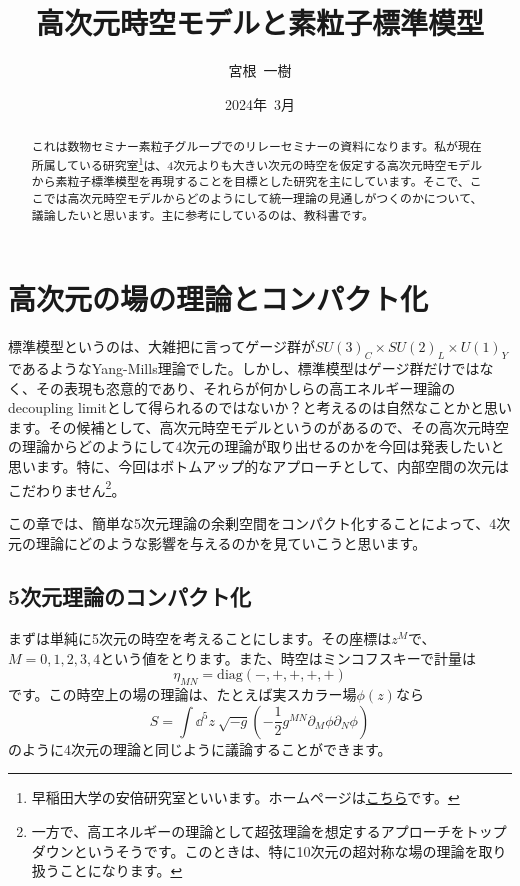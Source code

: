 \documentclass[unicode,a4paper,11pt]{ltjsarticle}
\title{高次元時空モデルと素粒子標準模型}
\author{宮根\ 一樹}
\date{2024年\ 3月}
\begin{document}
\maketitle

\begin{abstract}
   これは数物セミナー素粒子グループでのリレーセミナーの資料になります。私が現在所属している研究室\footnote{
      早稲田大学の安倍研究室といいます。ホームページは\href{http://www.hep.phys.waseda.ac.jp/index-j.html}{こちら}です。
   }は、4次元よりも大きい次元の時空を仮定する高次元時空モデルから素粒子標準模型を再現することを目標とした研究を主にしています。そこで、ここでは高次元時空モデルからどのようにして統一理論の見通しがつくのかについて、議論したいと思います。主に参考にしているのは、教科書\cite{Fujii:2005}です。
\end{abstract}

\tableofcontents

\clearpage

\section{高次元の場の理論とコンパクト化}

標準模型というのは、大雑把に言ってゲージ群が$SU(3)_{C}\times SU(2)_{L}\times U(1)_{Y}$であるようなYang-Mills理論でした。しかし、標準模型はゲージ群だけではなく、その表現も恣意的であり、それらが何かしらの高エネルギー理論のdecoupling limitとして得られるのではないか？と考えるのは自然なことかと思います。その候補として、高次元時空モデルというのがあるので、その高次元時空の理論からどのようにして4次元の理論が取り出せるのかを今回は発表したいと思います。特に、今回はボトムアップ的なアプローチとして、内部空間の次元はこだわりません\footnote{
   一方で、高エネルギーの理論として超弦理論を想定するアプローチをトップダウンというそうです。このときは、特に10次元の超対称な場の理論を取り扱うことになります。
}。

この章では、簡単な5次元理論の余剰空間をコンパクト化することによって、4次元の理論にどのような影響を与えるのかを見ていこうと思います。


\subsection{5次元理論のコンパクト化}

まずは単純に5次元の時空を考えることにします。その座標は$z^{M}$で、$M=0,1,2,3,4$という値をとります。また、時空はミンコフスキーで計量は
\begin{equation}
   \eta_{MN}
   =
   \mathrm{diag}(-,+,+,+,+)
\end{equation}
です。この時空上の場の理論は、たとえば実スカラー場$\phi(z)$なら
\begin{equation}
   S
   =
   \int\dd^5 z\ \sqrt{-g}
   \left(
   -\frac{1}{2}
   g^{MN}\partial_{M}\phi\partial_{N}\phi
   \right)
   \label{eqn:action_5d_real_scalar}
\end{equation}
のように4次元の理論と同じように議論することができます。
\end{document}
